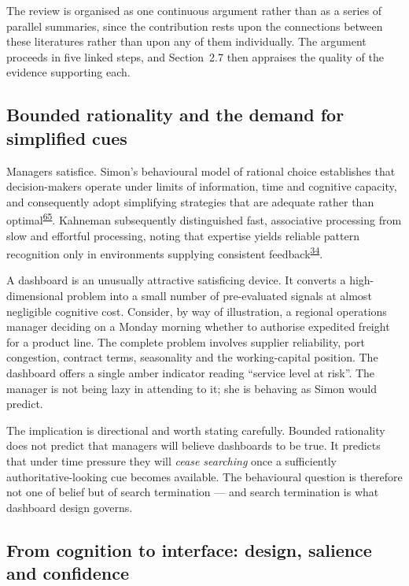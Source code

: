 \documentclass[11pt,a4paper]{article}
\numberwithin{figure}{section}
\numberwithin{table}{section}
\begin{document}
The review is organised as one continuous argument rather than as a series of parallel summaries, since the
contribution rests upon the connections between these literatures rather than upon any of them
individually. The argument proceeds in five linked steps, and Section~2.7 then appraises the quality of the
evidence supporting each.

\subsection{Bounded rationality and the demand for simplified cues}

Managers satisfice. Simon's behavioural model of rational choice establishes that decision-makers operate
under limits of information, time and cognitive capacity, and consequently adopt simplifying strategies
that are adequate rather than optimal\textsuperscript{\hyperlink{ref65}{65}}. Kahneman subsequently distinguished fast, associative
processing from slow and effortful processing, noting that expertise yields reliable pattern recognition
only in environments supplying consistent feedback\textsuperscript{\hyperlink{ref34}{34}}.

A dashboard is an unusually attractive satisficing device. It converts a high-dimensional problem into a
small number of pre-evaluated signals at almost negligible cognitive cost. Consider, by way of
illustration, a regional operations manager deciding on a Monday morning whether to authorise expedited
freight for a product line. The complete problem involves supplier reliability, port congestion, contract
terms, seasonality and the working-capital position. The dashboard offers a single amber indicator reading
``service level at risk''. The manager is not being lazy in attending to it; she is behaving as Simon would
predict.

The implication is directional and worth stating carefully. Bounded rationality does not predict that
managers will believe dashboards to be true. It predicts that under time pressure they will \emph{cease
searching} once a sufficiently authoritative-looking cue becomes available. The behavioural question is
therefore not one of belief but of search termination --- and search termination is what dashboard design
governs.

\subsection{From cognition to interface: design, salience and confidence}
\end{document}
